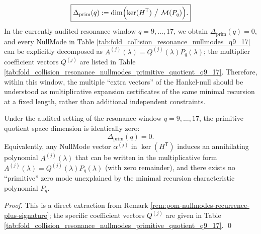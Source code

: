 \begin{remark}
\[
\boxed{
\Delta_{\mathrm{prim}}(q):=\dim\Bigl(\ker(H^{\mathsf T})\ \big/\ \mathcal{M}(P_q)\Bigr).
}
\]
In the currently audited resonance window \(q=9,\dots,17\), we obtain \(\Delta_{\mathrm{prim}}(q)=0\), and every NullMode in Table \ref{tab:fold_collision_resonance_nullmodes_q9_17} can be explicitly decomposed as
\(
A^{(j)}(\lambda)=Q^{(j)}(\lambda)P_q(\lambda)
\);
the multiplier coefficient vectors \(Q^{(j)}\) are listed in Table \ref{tab:fold_collision_resonance_nullmodes_primitive_quotient_q9_17}.
Therefore, within this window, the multiple ``extra vectors'' of the Hankel-null should be understood as multiplicative expansion certificates of the same minimal recursion at a fixed length, rather than additional independent constraints.
\end{remark}

\begin{corollary}\label{cor:pom-hankel-null-no-primitive-residual}
Under the audited setting of the resonance window \(q=9,\dots,17\), the primitive quotient space dimension is identically zero:
\[
\Delta_{\mathrm{prim}}(q)=0.
\]
Equivalently, any NullMode vector \(\alpha^{(j)}\) in \(\ker(H^{\mathsf T})\) induces an annihilating polynomial \(A^{(j)}(\lambda)\) that can be written in the multiplicative form
\(
A^{(j)}(\lambda)=Q^{(j)}(\lambda)P_q(\lambda)
\)
(with zero remainder), and there exists no ``primitive'' zero mode unexplained by the minimal recursion characteristic polynomial \(P_q\).
\end{corollary}
\begin{proof}
This is a direct extraction from Remark \ref{rem:pom-nullmodes-recurrence-plus-signature}; the specific coefficient vectors \(Q^{(j)}\) are given in Table \ref{tab:fold_collision_resonance_nullmodes_primitive_quotient_q9_17}. \qed
\end{proof}

